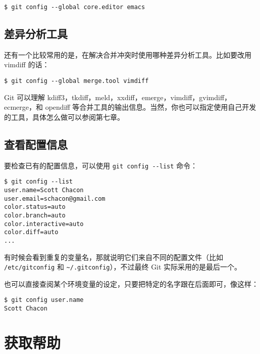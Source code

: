 \documentclass[a4paper]{book}
\begin{document}
\begin{shaded}\begin{verbatim}
$ git config --global core.editor emacs
\end{verbatim}\end{shaded}

\subsection{差异分析工具}

还有一个比较常用的是，在解决合并冲突时使用哪种差异分析工具。比如要改用 vimdiff 的话：

\begin{shaded}\begin{verbatim}
$ git config --global merge.tool vimdiff
\end{verbatim}\end{shaded}

Git 可以理解 kdiff3，tkdiff，meld，xxdiff，emerge，vimdiff，gvimdiff，ecmerge，和 opendiff 等合并工具的输出信息。当然，你也可以指定使用自己开发的工具，具体怎么做可以参阅第七章。

\subsection{查看配置信息}

要检查已有的配置信息，可以使用 \texttt{git config -{}-list} 命令：

\begin{shaded}\begin{verbatim}
$ git config --list
user.name=Scott Chacon
user.email=schacon@gmail.com
color.status=auto
color.branch=auto
color.interactive=auto
color.diff=auto
...
\end{verbatim}\end{shaded}

有时候会看到重复的变量名，那就说明它们来自不同的配置文件（比如 \texttt{/etc/gitconfig} 和 \texttt{\textasciitilde{}/.gitconfig}），不过最终 Git 实际采用的是最后一个。

也可以直接查阅某个环境变量的设定，只要把特定的名字跟在后面即可，像这样：

\begin{shaded}\begin{verbatim}
$ git config user.name
Scott Chacon
\end{verbatim}\end{shaded}

\section{获取帮助}
\end{document}
